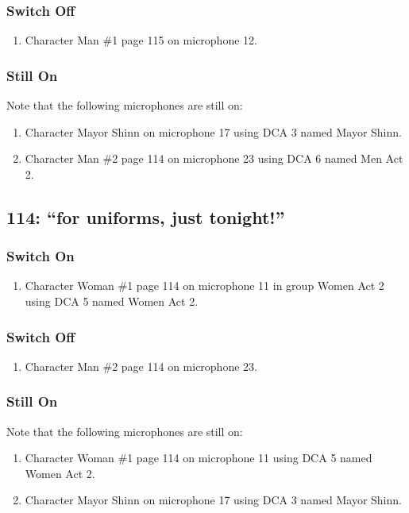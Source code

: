 \subsubsection* {Switch Off}
\begin{enumerate}
\item Character Man \#1 page 115 on microphone 12.
\end{enumerate}
\subsubsection* {Still On}
Note that the following microphones are still on:
\begin{enumerate}
\item Character Mayor Shinn on microphone 17 using DCA 3 named Mayor Shinn.
\item Character Man \#2 page 114 on microphone 23 using DCA 6 named Men Act 2.
\end{enumerate}
\subsection* {114: ``for uniforms, just tonight!''}
\subsubsection* {Switch On}
\begin{enumerate}
\item Character Woman \#1 page 114 on microphone 11 in group Women Act 2 using DCA 5 named Women Act 2.
\end{enumerate}
\subsubsection* {Switch Off}
\begin{enumerate}
\item Character Man \#2 page 114 on microphone 23.
\end{enumerate}
\subsubsection* {Still On}
Note that the following microphones are still on:
\begin{enumerate}
\item Character Woman \#1 page 114 on microphone 11 using DCA 5 named Women Act 2.
\item Character Mayor Shinn on microphone 17 using DCA 3 named Mayor Shinn.
\end{enumerate}
